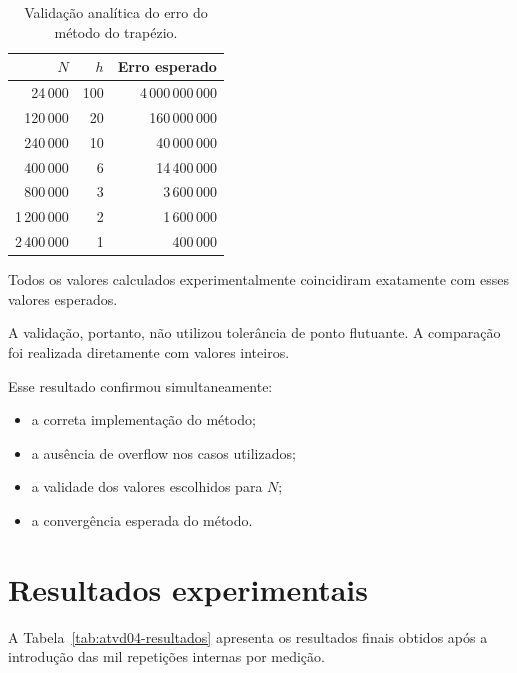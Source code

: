 \begin{table}[htbp]
    \centering
    \caption{Validação analítica do erro do método do trapézio.}
    \label{tab:atvd04-validacao}
    \begin{tabular}{r|r|r}
        \hline
        \(N\) & \(h\) & Erro esperado \\
        \hline
        24\,000    & 100 & 4\,000\,000\,000 \\
        120\,000   & 20  & 160\,000\,000 \\
        240\,000   & 10  & 40\,000\,000 \\
        400\,000   & 6   & 14\,400\,000 \\
        800\,000   & 3   & 3\,600\,000 \\
        1\,200\,000 & 2  & 1\,600\,000 \\
        2\,400\,000 & 1  & 400\,000 \\
        \hline
    \end{tabular}
\end{table}

Todos os valores calculados experimentalmente coincidiram exatamente com
esses valores esperados.

A validação, portanto, não utilizou tolerância de ponto flutuante. A
comparação foi realizada diretamente com valores inteiros.

Esse resultado confirmou simultaneamente:

\begin{itemize}
    \item a correta implementação do método;
    \item a ausência de overflow nos casos utilizados;
    \item a validade dos valores escolhidos para \(N\);
    \item a convergência esperada do método.
\end{itemize}


\section{Resultados experimentais}

\label{sec:atvd04-resultados}

A Tabela~\ref{tab:atvd04-resultados} apresenta os resultados finais obtidos
após a introdução das mil repetições internas por medição.

